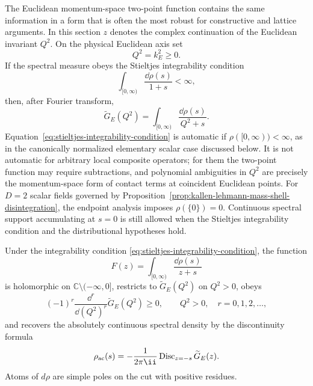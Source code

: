 \begin{definition}
\label{def:kallen-lehmann-stieltjes-datum}
The Euclidean momentum-space two-point function contains the same information
in a form that is often the most robust for constructive and lattice
arguments.  In this section \(z\) denotes the complex continuation of the
Euclidean invariant \(Q^2\).  On the physical Euclidean axis set
\[
  Q^2=k_E^2\ge0 .
\]
If the spectral measure obeys the Stieltjes integrability condition
\begin{equation}
  \int_{[0,\infty)}\frac{\dd\rho(s)}{1+s}<\infty ,
  \label{eq:stieltjes-integrability-condition}
\end{equation}
then, after Fourier transform,
\begin{equation}
  \widetilde G_E(Q^2)
  =
  \int_{[0,\infty)}
  \frac{\dd\rho(s)}{Q^2+s}.
  \label{eq:euclidean-stieltjes-propagator}
\end{equation}
Equation~\eqref{eq:stieltjes-integrability-condition} is automatic if
\(\rho([0,\infty))<\infty\), as in the canonically normalized elementary scalar
case discussed below.  It is not automatic for arbitrary local composite
operators; for them the two-point function may require subtractions, and
polynomial ambiguities in \(Q^2\) are precisely the momentum-space form of
contact terms at coincident Euclidean points.
For \(D=2\) scalar fields governed by
Proposition~\ref{prop:kallen-lehmann-mass-shell-disintegration}, the endpoint
analysis imposes \(\rho(\{0\})=0\).  Continuous spectral support accumulating at
\(s=0\) is still allowed when the Stieltjes integrability condition and the
distributional hypotheses hold.
\end{definition}

\begin{proposition}
\label{prop:kallen-lehmann-stieltjes-positivity}
Under the integrability condition
\eqref{eq:stieltjes-integrability-condition}, the function
\[
  F(z)=\int_{[0,\infty)}\frac{\dd\rho(s)}{z+s}
\]
is holomorphic on \(\mathbb C\setminus(-\infty,0]\), restricts to
\(\widetilde G_E(Q^2)\) on \(Q^2>0\), obeys
\[
  (-1)^r
  \frac{\dd^r}{\dd (Q^2)^r}\widetilde G_E(Q^2)\ge0,
  \qquad Q^2>0,\quad r=0,1,2,\ldots ,
\]
and recovers the absolutely continuous spectral density by the discontinuity
formula
\[
  \rho_{\rm ac}(s)
  =
  -\frac{1}{2\pi\ii}
  \operatorname{Disc}_{z=-s}\widetilde G_E(z).
\]
Atoms of \(d\rho\) are simple poles on the cut with positive residues.
\end{proposition}

